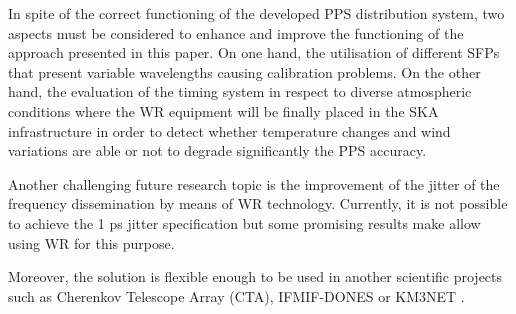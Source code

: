 In spite of the correct functioning of the developed PPS distribution system, 
two aspects must be considered to enhance and improve the functioning of the approach presented in this paper. 
On one hand, the utilisation of different SFPs that present variable wavelengths causing calibration problems.
On the other hand, the evaluation of the timing system in respect to diverse atmospheric conditions where the WR equipment will be finally placed in the SKA infrastructure in order to detect whether temperature changes and wind variations are able or not to degrade significantly the PPS accuracy. 

Another challenging future research topic is the improvement of the jitter of the frequency dissemination by means of WR technology. Currently, it is not possible to achieve the 1 ps jitter specification but some promising results make allow using WR for this purpose.

Moreover, the solution is flexible enough to be used in another scientific projects such as Cherenkov Telescope Array \cite{cta:website} (CTA), IFMIF-DONES \cite{ifmif:website} \cite{ifmif:ieee-paper1} or KM3NET \cite{km3net:website} \cite{km3net:tipp14}. 
